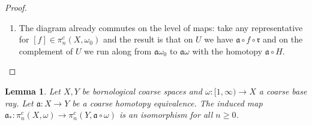 \documentclass[a4paper,11pt]{article}
\theoremstyle{definition}
\theoremstyle{plain}
\newtheorem{lemma}[definition]{Lemma}
\theoremstyle{remark}
\begin{document}
\begin{proof}
\begin{enumerate}
Let us compute the constants once again, for two points $(h\mathbf{x},h,ht)$ and $(s\mathbf{y},s,sl)$ in $V$.
\begin{align*}
\|\frac{2h\mathbf{x}}{t+1}-\frac{2s\mathbf{y}}{l+1}\| &= 2\|\frac{h\mathbf{x}}{t+1}-\frac{s\mathbf{x}}{t+1}+\frac{s\mathbf{x}}{t+1}-\frac{s \mathbf{y}}{t+1}+\frac{s\mathbf{y}}{t+1} - \frac{s \mathbf{y}}{l+1}\|\\
&\leq 2(|h-s|\|\mathbf{x}\| + s \|\mathbf{x}-\mathbf{y}\|+s\|\mathbf{y}\| |\frac{1}{t+1}-\frac{1}{l+1}|)\\
&\leq 2(n|h-s| + n|h-s| + \|h\mathbf{x}-s \mathbf{y}\|+ ns |t-l|)\\
&\leq 6n|h-s|+2\|h\mathbf{x}-s \mathbf{y}\|+2n |ht-sl|
\end{align*}
Hence $G$ is controlled. Properness is shown in a similar way to the previous points. 

\item The diagram already commutes on the level of maps: take any representative for $[f]\in \pi_{n}^{c}(X,\omega_0)$ and the result is that on $U$ we have $\mathfrak{a}\circ f \circ \mathfrak{r}$ and on the complement of $U$ we run along from $\mathfrak{a}\omega_0$ to $\mathfrak{a}\omega$ with the homotopy $\mathfrak{a}\circ H$. 

\end{enumerate}

\end{proof}


  \begin{lemma} \label{arrow1} Let $X,Y$ be bornological coarse spaces and $\omega: [1,\infty)\rightarrow X$ a coarse base ray. Let $\mathfrak{a}:X\rightarrow Y$ be a coarse homotopy equivalence. The induced map $\mathfrak{a}_{*}: \pi_{n}^c(X,\omega)\rightarrow \pi_n^c(Y,\mathfrak{a}\circ \omega)$ is an isomorphism for all $n\geq 0$. 
 \end{lemma}
\end{document}
